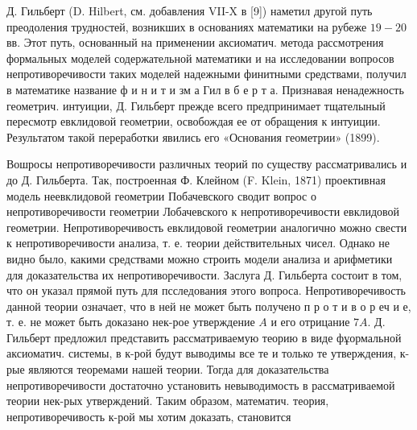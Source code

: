 \documentclass[10pt]{article}
\begin{document}
Д. Гильберт (D. Hilbert, см. добавления VII-X в [9]) наметил другой путь преодоления трудностей, возникших в основаниях математики на рубеже $19-20$ вв. Этот путь, основанный на применении аксиоматич. метода рассмотрения формальных моделей содержательной математики и на исследовании вопросов непротиворечивости таких моделей надежными финитными средствами, получил в математике название ф и н и т и зм а Гил в б е р т а. Признавая ненадежность геометрич. интуиции, Д. Гильберт прежде всего предпринимает тщателыный пересмотр евклидовой геометрии, освобождая ее от обращения к интуиции. Результатом такой переработки явились его «Основания геометрии» (1899).



Вошросы непротиворечивости различных теорий по существу рассматривались и до Д. Гильберта. Так, построенная Ф. Клейном (F. Klein, 1871) проективная модель неевклидовой геометрии Побачевского сводит вопрос о непротиворечивости геометрии Лобачевского к непротиворечивости евклидовой геометрии. Непротиворечивость евклидовой геометрии аналогично можно свести к непротиворечивости анализа, т. е. теории действительных чисел. Однако не видно было, какими средствами можно строить модели анализа и арифметики для доказательства их непротиворечивости. Заслуга Д. Гильберта состоит в том, что он указал прямой путь для псследования этого вопроса. Непротиворечивость данной теории означает, что в ней не может быть получено п р о т и в о р еч и е, т. е. не может быть доказано нек-рое утверждение $A$ и его отрицание $7 A$. Д. Гильберт предложил представить рассматриваемую теорию в виде фұормальной аксиоматич. системы, в к-рой будут выводимы все те и только те утверждения, к-рые являются теоремами нашей теории. Тогда для доказательства непротиворечивости достаточно установить невыводимость в рассматриваемой теории нек-рых утверждений. Таким образом, математич. теория, непротиворечивость к-рой мы хотим доказать, становится
\end{document}
